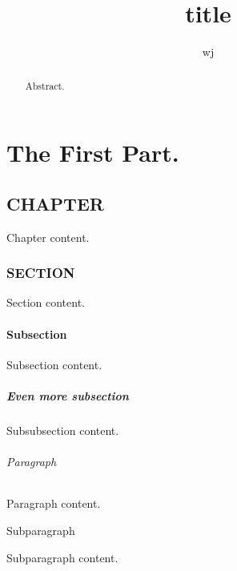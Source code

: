 \documentclass[12pt]{report}
\begin{document}
\title{title}
\author{wj}
\date{}
\maketitle

\renewcommand{\abstractname}{abstract}
\begin{abstract}
Abstract.
\end{abstract}

\renewcommand{\contentsname}{table of contents}
\tableofcontents

\renewcommand{\listfigurename}{list of figures}
\listoffigures

\renewcommand{\listtablename}{list of tables}
\listoftables


\part{The First Part.}   %

\chapter{CHAPTER}
Chapter content.

\section{SECTION}
Section content.

\subsection{Subsection}
Subsection content.

\subsubsection{Even more subsection}
Subsubsection content.

\paragraph{Paragraph}
Paragraph content.

\subparagraph{Subparagraph}
Subparagraph content.
\end{document}
